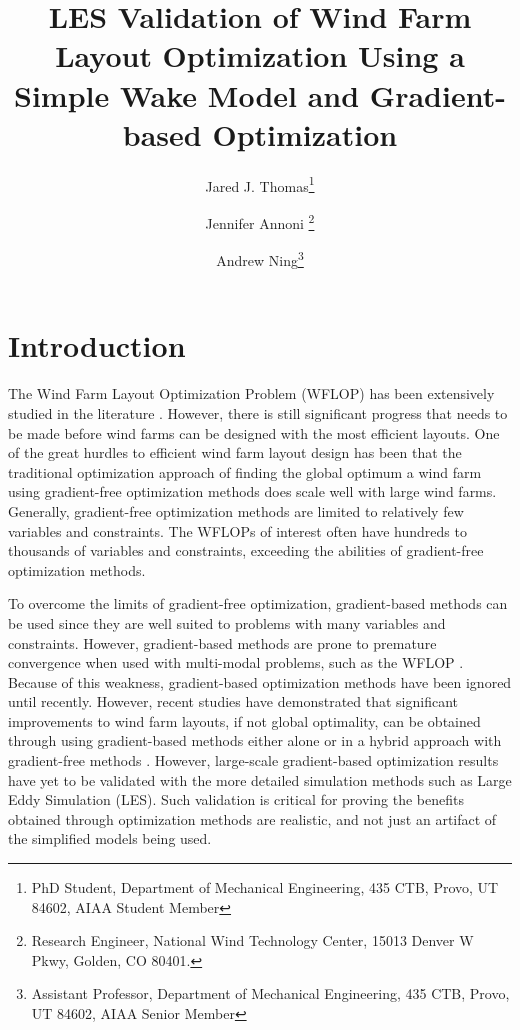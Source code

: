 \documentclass[conf]{new-aiaa}
\title{LES Validation of Wind Farm Layout Optimization Using a Simple Wake Model and Gradient-based Optimization}
\author{Jared J. Thomas\footnote{PhD Student, Department of Mechanical Engineering, 435 CTB, Provo, UT 84602, AIAA Student Member}}
\affil{Brigham Young University, Provo, UT 84602}
\author{Jennifer Annoni \footnote{Research Engineer, National Wind Technology Center, 15013 Denver W Pkwy, Golden, CO 80401.}}
\affil{National Renewable Energy Laboratory, Golden, CO, 80401, USA}
\author{Andrew Ning\footnote{Assistant Professor, Department of Mechanical Engineering, 435 CTB, Provo, UT 84602, AIAA Senior Member}}
\affil{Brigham Young University, Provo, UT 84602}
\begin{document}
\maketitle



\section{Introduction}
The Wind Farm Layout Optimization Problem (WFLOP) has been extensively studied in the literature \cite{samorani2013,lackner2007,parada2017,elkinton2008,tingey2015,thomas2015_sustech,valverde2014,fleming2015}. However, there is still significant progress that needs to be made before wind farms can be designed with the most efficient layouts. 
One of the great hurdles to efficient wind farm layout design has been that the traditional optimization approach of finding the global optimum a wind farm using gradient-free optimization methods does scale well with large wind farms. Generally, gradient-free optimization methods are limited to relatively few variables and constraints. The WFLOPs of interest often have hundreds to thousands of variables and constraints, exceeding the abilities of gradient-free optimization methods.

To overcome the limits of gradient-free optimization, gradient-based methods can be used since they are well suited to problems with many variables and constraints. However, gradient-based methods are prone to premature convergence when used with multi-modal problems, such as the WFLOP \cite{acero2014}. Because of this weakness, gradient-based optimization methods have been ignored until recently. However, recent studies have demonstrated that significant improvements to wind farm layouts, if not global optimality, can be obtained through using gradient-based methods either alone \cite{fleming2015, gebraad2017-max-aep, thomas2017} or in a hybrid approach with gradient-free methods \cite{rethore2014}. However, large-scale gradient-based optimization results have yet to be validated with the more detailed simulation methods such as Large Eddy Simulation (LES). Such validation is critical for proving the benefits obtained through optimization methods are realistic, and not just an artifact of the simplified models being used.
\end{document}
